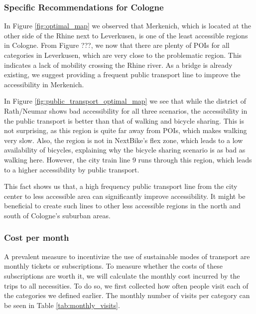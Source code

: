 \subsubsection{Specific Recommendations for Cologne}

In Figure \ref{fig:optimal_map} we observed that Merkenich, which is located at the other side of the Rhine next to Leverkusen, is one of the least accessible regions in Cologne.
From Figure ???, we now that there are plenty of POIs for all categories in Leverkusen, which are very close to the problematic region.
This indicates a lack of mobility crossing the Rhine river.
As a bridge is already existing, we suggest providing a frequent public transport line to improve the accessibility in Merkenich.

In Figure \ref{fig:public_transport_optimal_map} we see that while the district of Rath/Neumar shows bad accessibility for all three scenarios, the accessibility in the public transport is better than that of walking and bicycle sharing.
This is not surprising, as this region is quite far away from POIs, which makes walking very slow.
Also, the region is not in NextBike's flex zone, which leads to a low availability of bicycles, explaining why the bicycle sharing scenario is as bad as walking here.
However, the city train line 9 runs through this region, which leads to a higher accessibility by public transport.

This fact shows us that, a high frequency public transport line from the city center to less accessible area can significantly improve accessibility.
It might be beneficial to create such lines to other less accessible regions in the north and south of Cologne's suburban areas.


\subsubsection{Cost per month}

A prevalent measure to incentivize the use of sustainable modes of transport are monthly tickets or subscriptions.
To measure whether the costs of these subscriptions are worth it, we will calculate the monthly cost incurred by the trips to all necessities.
To do so, we first collected how often people visit each of the categories we defined earlier.
The monthly number of visits per category can be seen in Table \ref{tab:monthly_visits}.

